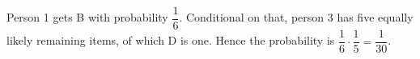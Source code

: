 Person 1 gets B with probability $\dfrac{1}{6}$. Conditional on that, person 3 has five equally likely remaining items, of which D is one. Hence the probability is $\dfrac{1}{6}\cdot\dfrac{1}{5}=\boxed{\dfrac{1}{30}}$.
